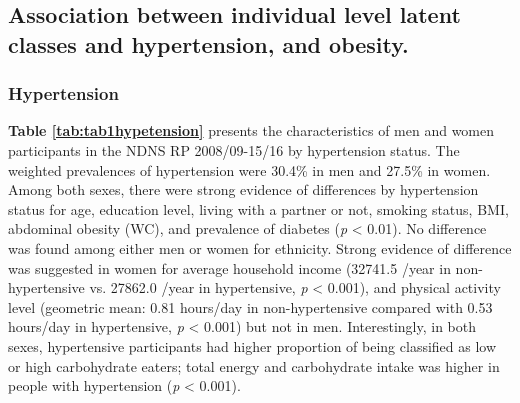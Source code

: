

\subsection{Association between individual level latent classes and hypertension, and obesity.}\vspace{-0.3cm}

\subsubsection{Hypertension}\vspace{-0.3cm}

\textbf{Table \ref{tab:tab1hypetension}} presents the characteristics of men and women participants in the NDNS RP 2008/09-15/16 by hypertension status. The weighted prevalences of hypertension were 30.4\% in men and 27.5\% in women. Among both sexes, there were strong evidence of differences by hypertension status for age, education level, living with a partner or not, smoking status, BMI, abdominal obesity (WC), and prevalence of diabetes (\textit{p} < 0.01). No difference was found among either men or women for ethnicity. Strong evidence of difference was suggested in women for average household income (32741.5 \textsterling/year in non-hypertensive vs. 27862.0 \textsterling/year in hypertensive, \textit{p} < 0.001), and physical activity level (geometric mean: 0.81 hours/day in non-hypertensive compared with 0.53 hours/day in hypertensive, \textit{p} < 0.001) but not in men. Interestingly, in both sexes, hypertensive participants had higher proportion of being classified as low or high carbohydrate eaters; total energy and carbohydrate intake was higher in people with hypertension (\textit{p} < 0.001).

